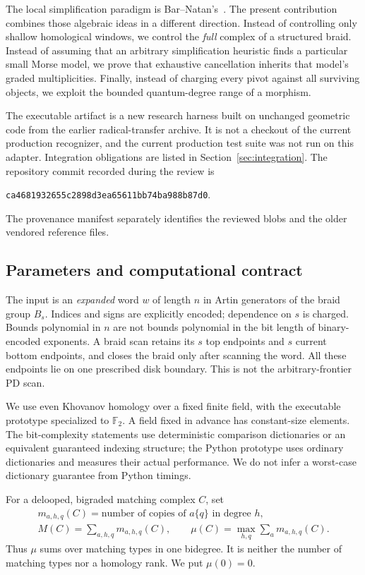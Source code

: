 \documentclass[11pt,letterpaper]{article}
\theoremstyle{remark}\newtheorem{remark}[theorem]{Remark}
\newcommand{\F}{\mathbb F}
\begin{document}
The local simplification paradigm is Bar--Natan's~\cite{BN07}. The present contribution combines those algebraic ideas in a different direction. Instead of controlling only shallow homological windows, we control the \emph{full} complex of a structured braid. Instead of assuming that an arbitrary simplification heuristic finds a particular small Morse model, we prove that exhaustive cancellation inherits that model's graded multiplicities. Finally, instead of charging every pivot against all surviving objects, we exploit the bounded quantum-degree range of a morphism.

The executable artifact is a new research harness built on unchanged geometric code from the earlier radical-transfer archive. It is not a checkout of the current production recognizer, and the current production test suite was not run on this adapter. Integration obligations are listed in Section~\ref{sec:integration}. The repository commit recorded during the review is
\begin{center}\small\texttt{ca4681932655c2898d3ea65611bb74ba988b87d0}.\end{center}
The provenance manifest separately identifies the reviewed blobs and the older vendored reference files.

\subsection{Parameters and computational contract}
The input is an \emph{expanded} word $w$ of length $n$ in Artin generators of the braid group $B_s$. Indices and signs are explicitly encoded; dependence on $s$ is charged. Bounds polynomial in $n$ are not bounds polynomial in the bit length of binary-encoded exponents. A braid scan retains its $s$ top endpoints and $s$ current bottom endpoints, and closes the braid only after scanning the word. All these endpoints lie on one prescribed disk boundary. This is not the arbitrary-frontier PD scan.

We use even Khovanov homology over a fixed finite field, with the executable prototype specialized to $\F_2$. A field fixed in advance has constant-size elements. The bit-complexity statements use deterministic comparison dictionaries or an equivalent guaranteed indexing structure; the Python prototype uses ordinary dictionaries and measures their actual performance. We do not infer a worst-case dictionary guarantee from Python timings.

For a delooped, bigraded matching complex $C$, set
\begin{equation}\label{eq:params}
\begin{gathered}
 m_{a,h,q}(C)=\text{number of copies of }a\{q\}\text{ in degree }h,\\
 M(C)=\sum_{a,h,q}m_{a,h,q}(C),\qquad
 \mu(C)=\max_{h,q}\sum_a m_{a,h,q}(C).
\end{gathered}
\end{equation}
Thus $\mu$ sums over matching types in one bidegree. It is neither the number of matching types nor a homology rank. We put $\mu(0)=0$.
\end{document}
